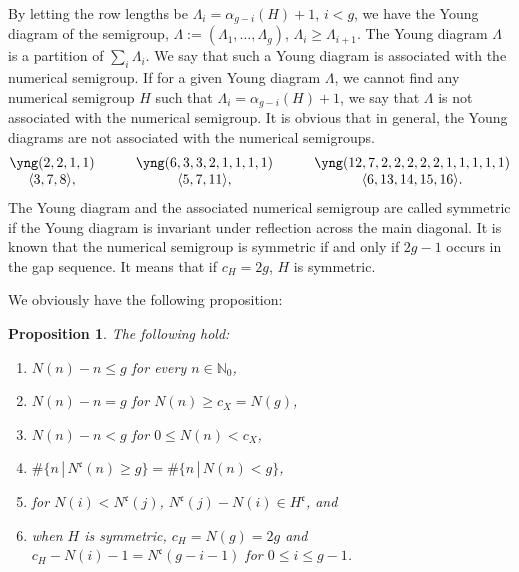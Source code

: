 \documentclass[10pt,a4paper]{amsart}
\def\NN{{\mathbb N}}
\def\fc{{\mathfrak c}}
\numberwithin{equation}{section}
\newtheorem{Proposition}[Theorem]{Proposition}
 { \theoremstyle{definition}
\newtheorem{Definition}[Theorem]{Definition}
\newtheorem{Note}[Theorem]{Note}
\newtheorem{Example}[Theorem]{Example}
\newtheorem{Remark}[Theorem]{Remark} }
\begin{document}
By letting the row lengths be $\Lambda_i = \alpha_{g-i}(H)+1$, $i< g$, we have the Young diagram of the semigroup, $\Lambda:=(\Lambda_1, \dots, \Lambda_g)$, $\Lambda_i \ge \Lambda_{i+1}$.
The Young diagram $\Lambda$ is a partition of $\sum_i\Lambda_i$.
We say that such a Young diagram is associated with the numerical semigroup.
If for a given Young diagram $\Lambda$, we cannot find any numerical semigroup $H$ such that $\Lambda_i = \alpha_{g-i}(H)+1$, we say that $\Lambda$ is not associated with the numerical semigroup.
It is obvious that in general, the Young diagrams are not associated with the numerical semigroups.
\begin{gather*}
\begin{matrix}
\yng(2,2,1,1)\qquad &
\yng(6,3,3,2,1,1,1,1)\qquad &
\yng(12,7,2,2,2,2,2,1,1,1,1,1)
\\
 \langle3, 7, 8\rangle, \qquad &
 \langle5,7,11\rangle, \qquad
 &\langle6,13,14,15,16\rangle.\\
\end{matrix}%
\end{gather*}
The Young diagram and the associated numerical semigroup are called symmetric if the Young diagram is invariant under reflection across the main diagonal.
It is known that the numerical semigroup is symmetric if and only if $2g-1$ occurs in the gap sequence.
It means that if $c_H=2g$, $H$ is symmetric.

We obviously have the following proposition:
\begin{Proposition}\label{2pr:N(n)}
The following hold:
\begin{enumerate}\itemsep=0pt
\item[$(1)$] $N(n) - n \le g$ for every $n\in \NN_0$,

\item[$(2)$]
$N(n) - n = g$ for $N(n)\ge c_X=N(g)$,

\item[$(3)$] $N(n) - n < g$ for $0\le N(n)< c_X$,

\item[$(4)$]
$\#\{n \, |\, N^\fc(n) \ge g\}=\#\{n \, |\, N(n) < g\}$,

\item[$(5)$] for $N(i) < N^\fc(j)$, $N^\fc(j)-N(i)\in H^\fc$, and

\item[$(6)$] when $H$ is symmetric, $c_H=N(g)=2g$ and
$c_H - N(i)-1=N^\fc(g-i-1)$ for $0\le i\le g-1$.
\end{enumerate}
\end{Proposition}
\end{document}
